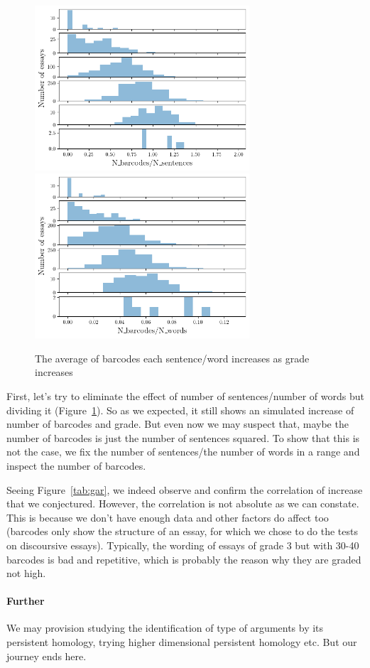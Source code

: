 \begin{figure}[htbp]
  \includegraphics[width=8cm]{gradesah1s.png}
  \includegraphics[width=8cm]{gradesah1w.png}
  \caption{The average of barcodes each sentence/word increases as grade increases}
  \label{fig:ads}
\end{figure}

First, let's try to eliminate the effect of number of sentences/number of words
but dividing it (Figure~\ref{fig:ads}). So as we expected, it still shows an simulated
increase of number of barcodes and grade. But even now we may suspect that,
maybe the number of barcodes is just the number of sentences squared. To show that
this is not the case, we fix the number of sentences/the number of words in a range
and inspect the number of barcodes.



Seeing Figure~\ref{tab:gar}, we indeed observe and confirm the correlation of increase
that we conjectured. However, the correlation is not absolute as we can constate.
This is because we don't have enough data and other factors do affect
too (barcodes only show the structure of an essay, for which we
chose to do the tests on discoursive essays). Typically, the wording
of essays of grade 3 but with 30-40 barcodes is bad and repetitive, which is
probably the reason why they are graded not high.

\paragraph{Further} We may provision studying the identification of type
of arguments by its persistent homology, trying higher dimensional
persistent homology etc. But our journey ends here.